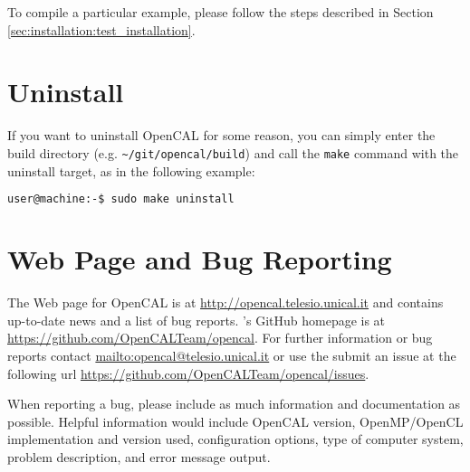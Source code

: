 To compile a particular example, please follow the steps described in
Section \ref{sec:installation:test_installation}.


\section{Uninstall}

If you want to uninstall OpenCAL for some reason, you can simply enter
the build directory (e.g. \verb'~/git/opencal/build') and call the
\verb'make' command with the uninstall target, as in the following
example:

\begin{lstlisting}[numbers=none,language=bash,label={ch:quickstart:sudouninstall}]
  user@machine:-$ sudo make uninstall
\end{lstlisting}

\section{Web Page and Bug Reporting}

The Web page for OpenCAL is at \url{http://opencal.telesio.unical.it} and
contains up-to-date news and a list of bug reports. \ocal's GitHub
homepage is at \url{https://github.com/OpenCALTeam/opencal}. For
further information or bug reports contact
\url{mailto:opencal@telesio.unical.it} or use the submit an issue at the
following url \url{https://github.com/OpenCALTeam/opencal/issues}.

When reporting a bug, please include as much information and
documentation as possible. Helpful information would include OpenCAL
version, OpenMP/OpenCL implementation and version used,
configuration options, type of computer system, problem description,
and error message output.
